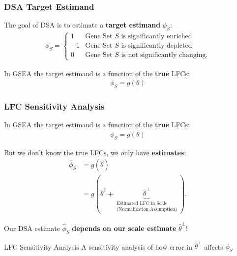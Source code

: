 \documentclass[11pt,t]{beamer}
\begin{document}
\begin{frame}
  \frametitle{DSA Target Estimand}
  
  The goal of DSA is to estimate a \textbf{target estimand} \(\phi_S\):
  \begin{align*}
    \phi_S = \begin{cases}
      1 & \text{Gene Set } S \text{ is significantly enriched} \\
      -1 & \text{Gene Set } S \text{ is significantly depleted} \\
      0 & \text{Gene Set } S \text{ is not significantly changing}.
    \end{cases}
  \end{align*}

  \vspace{10px}

  In GSEA the target estimand is a function of the \textbf{true} LFCs:
  \begin{align*}
    \phi_S = g(\theta)
  \end{align*}

\end{frame}

\begin{frame}
  \frametitle{LFC Sensitivity Analysis}

  In GSEA the target estimand is a function of the \textbf{true} LFCs:
  \begin{align*}
    \phi_S = g(\theta)
  \end{align*}

  \vspace{10px}

  But we don't know the true LFCs, we only have \textbf{estimates}:
  \begin{align*}
    \hat{\phi}_S &= g(\hat{\theta}) \\
                 &= g(\hat{\theta}^\parallel + \underbrace{\hat{\theta}^\perp}_{\substack{\text{Estimated LFC in Scale} \\ \text{(Normalization Assumption)}}}).
  \end{align*}
  
  \pause

  \vspace{10px}
  
  Our DSA estimate \(\hat{\phi}_S\) \textbf{depends on our scale estimate} \(\hat{\theta}^\perp\)!

  \pause
  
  \begin{block}{LFC Sensitivity Analysis}
    A sensitivity analysis of how error in \(\hat{\theta}^\perp\) affects \(\phi_S\)
  \end{block}
  
\end{frame}
\end{document}
